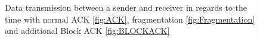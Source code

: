 \begin{figure}%
    \centering
    \\
    \\
    \caption{Data transmission between a sender and receiver in regards to the time with normal \acf{ACK} \autoref{fig:ACK},
    fragmentation \autoref{fig:Fragmentation} and additional Block \ac{ACK} \autoref{fig:BLOCKACK}}%
    \label{fig:ACKS}%
\end{figure}

